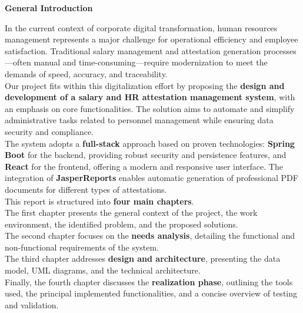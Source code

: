\documentclass[a4paper,12pt]{report}
\begin{document}
\newpage
\listoffigures
\newpage

\cleardoublepage
{}

\renewcommand{\headrulewidth}{1pt}
\fancyhead[L]{\hspace*{4cm}}

{}
\begin{center}
\vspace{9cm}
    \textbf{\huge{General Introduction}}
\end{center}
\begin{doublespace}
\vspace{1cm}
\hspace{1cm}In the current context of corporate digital transformation, human resources management represents a major challenge for operational efficiency and employee satisfaction. Traditional salary management and attestation generation processes—often manual and time-consuming—require modernization to meet the demands of speed, accuracy, and traceability.\\

Our project fits within this digitalization effort by proposing the \textbf{design and development of a salary and HR attestation management system}, with an emphasis on core functionalities. The solution aims to automate and simplify administrative tasks related to personnel management while ensuring data security and compliance.\\

The system adopts a \textbf{full-stack} approach based on proven technologies: \textbf{Spring Boot} for the backend, providing robust security and persistence features, and \textbf{React} for the frontend, offering a modern and responsive user interface. The integration of \textbf{JasperReports} enables automatic generation of professional PDF documents for different types of attestations.\\

This report is structured into \textbf{four main chapters}.\\
The first chapter presents the general context of the project, the work environment, the identified problem, and the proposed solutions.\\
The second chapter focuses on the \textbf{needs analysis}, detailing the functional and non-functional requirements of the system.\\
The third chapter addresses \textbf{design and architecture}, presenting the data model, UML diagrams, and the technical architecture.\\
Finally, the fourth chapter discusses the \textbf{realization phase}, outlining the tools used, the principal implemented functionalities, and a concise overview of testing and validation.\\


\end{doublespace}
\end{document}
